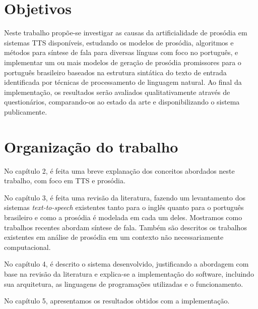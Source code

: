 \section{Objetivos}
Neste trabalho propõe-se investigar as causas da artificialidade de prosódia em sistemas TTS disponíveis, estudando os modelos de prosódia, algoritmos e métodos para síntese de fala para diversas línguas com foco no português, e implementar um ou mais modelos de geração de prosódia promissores para o português brasileiro baseados na estrutura sintática do texto de entrada identificada por técnicas de processamento de linguagem natural. Ao final da implementação, os resultados serão avaliados qualitativamente através de questionários, comparando-os ao estado da arte e disponibilizando o sistema publicamente.

\section{Organização do trabalho}

No capítulo 2, é feita uma breve explanação dos conceitos abordados neste
trabalho, com foco em TTS e prosódia.


No capítulo 3, é feita uma revisão da literatura, fazendo um levantamento dos
sistemas \emph{text-to-speech} existentes tanto para o inglês quanto para o
português brasileiro e como a prosódia é modelada em cada um deles. Mostramos
como trabalhos recentes abordam síntese de fala. Também são descritos os
trabalhos existentes em análise de prosódia em um contexto não necessariamente
computacional.

No capítulo 4, é descrito o sistema desenvolvido, justificando a abordagem com
base na revisão da literatura e explica-se a implementação do software,
incluindo sua arquitetura, as linguagens de programações utilizadas e o
funcionamento.

No capítulo 5,
apresentamos os resultados obtidos com a implementação.